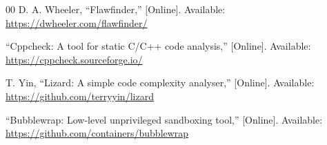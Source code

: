 \documentclass[conference]{IEEEtran}
\begin{document}
\begin{thebibliography}{00}
 D. A. Wheeler, ``Flawfinder,'' [Online]. Available:
\url{https://dwheeler.com/flawfinder/}

 ``Cppcheck: A tool for static C/C++ code analysis,''
[Online]. Available: \url{https://cppcheck.sourceforge.io/}

 T. Yin, ``Lizard: A simple code complexity analyser,''
[Online]. Available: \url{https://github.com/terryyin/lizard}

 ``Bubblewrap: Low-level unprivileged sandboxing tool,''
[Online]. Available: \url{https://github.com/containers/bubblewrap}

\end{thebibliography}
\end{document}
